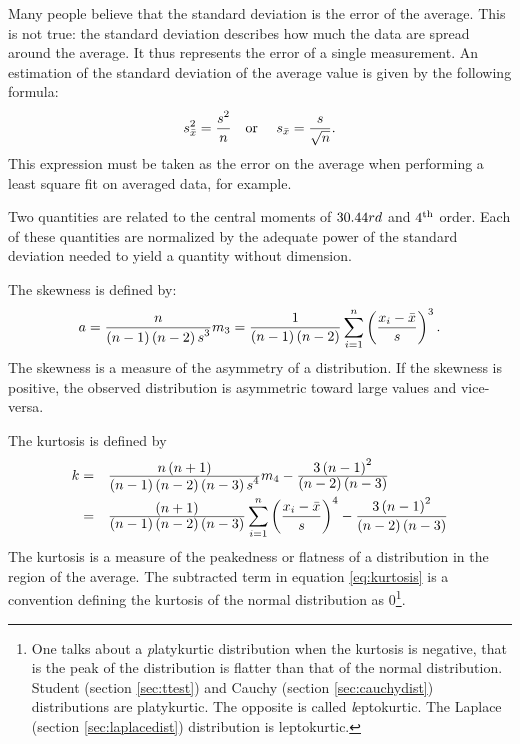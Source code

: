 Many people believe that the standard deviation is the error of
the average. This is not true: the standard deviation describes
how much the data are spread around the average. It thus
represents the error of a single measurement. An estimation of the
standard deviation of the average value is given by the following
formula:
\begin{equation}
\label{eq:averagerror}
  s_{\bar{x}}^2={\displaystyle s^2 \over n}
  \mbox{\quad or \quad}
  s_{\bar{x}}={\displaystyle s \over \sqrt{n}}.
\end{equation}
This expression must be taken as the error on the average when
performing a least square fit on averaged data, for example.

Two quantities are related to the central moments of $30.44{rd}$
and $4^{\mathop{\textrm{th}}}$ order. Each of these quantities are normalized by the
adequate power of the standard deviation needed to yield a
quantity without dimension.

\noindent The skewness is defined by:
\begin{equation}
  a={\displaystyle n \over\displaystyle
  \left(n-1\right)\left(n-2\right)s^3}m_3
  ={\displaystyle 1 \over\displaystyle
  \left(n-1\right)\left(n-2\right)}
  \sum_{i=1}^n\left({\displaystyle x_i-\bar{x}\over\displaystyle s}\right)^3.
\end{equation}
The skewness is a measure of the asymmetry of a distribution. If
the skewness is positive, the observed distribution is asymmetric
toward large values and vice-versa.

\noindent The kurtosis is defined by
\begin{equation}
\label{eq:kurtosis}
  \begin{array}{rl}
    k=& {\displaystyle n\left(n+1\right) \over\displaystyle
  \left(n-1\right)\left(n-2\right)\left(n-3\right)s^4}m_4 -{\displaystyle 3\left(n-1\right)^2 \over\displaystyle
  \left(n-2\right)\left(n-3\right)}\\*[2ex]
    =& {\displaystyle \left(n+1\right) \over\displaystyle
  \left(n-1\right)\left(n-2\right)\left(n-3\right)}
  \displaystyle\sum_{i=1}^n\left({\displaystyle x_i-\bar{x}\over\displaystyle s}\right)^4 -{\displaystyle 3\left(n-1\right)^2 \over\displaystyle
  \left(n-2\right)\left(n-3\right)}
  \end{array}
\end{equation}
The kurtosis is a measure of the peakedness or flatness of a
distribution in the region of the average. The subtracted term in
equation \ref{eq:kurtosis} is a convention defining the kurtosis
of the normal distribution as 0\footnote{One talks about a {\textsl
platykurtic} distribution when the kurtosis is negative, that is
the peak of the distribution is flatter than that of the normal
distribution. Student (\cf section \ref{sec:ttest}) and Cauchy
(\cf section \ref{sec:cauchydist}) distributions are platykurtic.
The opposite is called {\textsl leptokurtic}. The Laplace (\cf section
\ref{sec:laplacedist}) distribution is leptokurtic. }.

